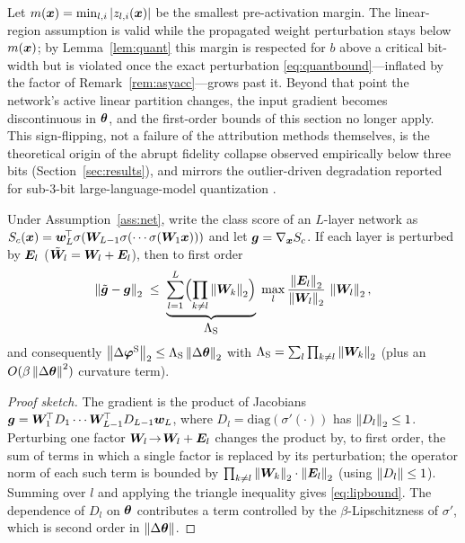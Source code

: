 \begin{remark}
\label{rem:reluflip}
Let $m(\bm{x})=\min_{l,i}|z_{l,i}(\bm{x})|$ be the smallest pre-activation margin. The
linear-region assumption is valid while the propagated weight perturbation stays
below $m(\bm{x})$; by Lemma~\ref{lem:quant} this margin is respected for $b$ above a
critical bit-width but is violated once the exact perturbation
\eqref{eq:quantbound}---inflated by the factor of Remark~\ref{rem:asyacc}---grows
past it. Beyond that point the network's active linear partition changes, the
input gradient becomes discontinuous in $\bm{\theta}$, and the first-order bounds of
this section no longer apply. This sign-flipping, not a failure of the
attribution methods themselves, is the theoretical origin of the abrupt fidelity
collapse observed empirically below three bits (Section~\ref{sec:results}), and
mirrors the outlier-driven degradation reported for sub-3-bit large-language-model
quantization \cite{dettmers2022llmint8}.
\end{remark}

\begin{theorem}
\label{thm:lipschitz}
Under Assumption~\ref{ass:net}, write the class score of an $L$-layer network as
$S_c(\bm{x})=\bm w_L^{\!\top}\sigma(\bm{W}_{L-1}\sigma(\cdots\sigma(\bm{W}_1\bm{x})))$ and let
$\bm{g}=\nabla_{\bm{x}}S_c$. If each layer is perturbed by $\bm{E}_l$
($\tilde{\bm{W}}_l=\bm{W}_l+\bm{E}_l$), then to first order
\begin{equation}
\left\lVert\tilde{\bm{g}}-\bm{g}\right\rVert_2\;\le\;\underbrace{\sum_{l=1}^{L}\Bigl(\prod_{k\ne l}
\left\lVert\bm{W}_k\right\rVert_2\Bigr)}_{\displaystyle \Lambda_{\mathrm S}}
\;\max_l\frac{\left\lVert\bm{E}_l\right\rVert_2}{\left\lVert\bm{W}_l\right\rVert_2}\,\left\lVert\bm{W}_l\right\rVert_2 ,
\label{eq:lipbound}
\end{equation}
and consequently $\left\lVert\Delta\bm{\varphi}^{\mathrm S}\right\rVert_2\le\Lambda_{\mathrm S}
\left\lVert\Delta\bm{\theta}\right\rVert_2$ with
$\Lambda_{\mathrm S}=\sum_{l}\prod_{k\ne l}\left\lVert\bm{W}_k\right\rVert_2$ (plus an
$O(\beta\left\lVert\Delta\bm{\theta}\right\rVert^2)$ curvature term).
\end{theorem}

\begin{proof}[Proof sketch]
The gradient is the product of Jacobians $\bm{g}=\bm{W}_1^{\!\top}D_1\cdots
\bm{W}_{L-1}^{\!\top}D_{L-1}\bm w_L$, where $D_l=\mathrm{diag}(\sigma'(\cdot))$ has
$\left\lVert D_l\right\rVert_2\le 1$. Perturbing one factor $\bm{W}_l\!\to\!\bm{W}_l+\bm{E}_l$ changes the
product by, to first order, the sum of terms in which a single factor is
replaced by its perturbation; the operator norm of each such term is bounded by
$\prod_{k\ne l}\left\lVert\bm{W}_k\right\rVert_2\cdot\left\lVert\bm{E}_l\right\rVert_2$ (using $\left\lVert D_l\right\rVert\le1$).
Summing over $l$ and applying the triangle inequality gives \eqref{eq:lipbound}.
The dependence of $D_l$ on $\bm{\theta}$ contributes a term controlled by the
$\beta$-Lipschitzness of $\sigma'$, which is second order in
$\left\lVert\Delta\bm{\theta}\right\rVert$.
\end{proof}

